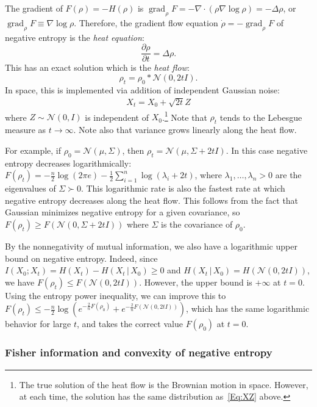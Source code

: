 \documentclass[final,12pt]{colt2018}
\newcommand{\N}{\mathcal{N}}
\renewcommand{\part}[2]{\frac{\partial #1}{\partial #2}}
\DeclareMathOperator{\grad}{grad}
\begin{document}
The gradient of $F(\rho) = -H(\rho)$ is $\grad_\rho F = -\nabla \cdot (\rho \nabla \log \rho) = -\Delta \rho$,
or $\grad_\rho F \equiv \nabla \log \rho$.
Therefore, the gradient flow equation $\dot \rho = -\grad_\rho F$ of negative entropy is the {\em heat equation}:
$$\part{\rho}{t} = \Delta \rho.$$
This has an exact solution which is the {\em heat flow}:
$$\rho_t = \rho_0 \ast \N(0,2t I).$$
In space, this is implemented via addition of independent Gaussian noise:
\begin{align}\label{Eq:XZ}
X_t = X_0 + \sqrt{2t} Z
\end{align}
where $Z \sim \N(0,I)$ is independent of $X_0$.\footnote{The true solution of the heat flow is the Brownian motion in space.
However, at each time, the solution has the same distribution as~\eqref{Eq:XZ} above.}
Note that $\rho_t$ tends to the Lebesgue measure as $t \to \infty$.
Note also that variance grows linearly along the heat flow.

For example, if $\rho_0 = \N(\mu,\Sigma)$, then $\rho_t = \N(\mu,\Sigma + 2tI)$.
In this case negative entropy decreases logarithmically:
$F(\rho_t) = -\frac{n}{2} \log (2\pi e) - \frac{1}{2} \sum_{i=1}^n \log (\lambda_i + 2t)$, where $\lambda_1,\dots,\lambda_n > 0$ are the eigenvalues of $\Sigma \succ 0$.
%
This logarithmic rate is also the fastest rate at which negative entropy decreases along the heat flow.
This follows from the fact that 
Gaussian minimizes negative entropy for a given covariance, so
$F(\rho_t) \ge F(\N(0,\Sigma+2tI))$ where $\Sigma$ is the covariance of $\rho_0$.

By the nonnegativity of mutual information, we also have a logarithmic upper bound on negative entropy.
Indeed, since $I(X_0;X_t) = H(X_t) - H(X_t \,|\, X_0) \ge 0$ and $H(X_t\,|\,X_0) = H(\N(0,2tI))$, we have $F(\rho_t) \le F(\N(0,2tI))$.
However, the upper bound is $+\infty$ at $t = 0$.
Using the entropy power inequality, 
we can improve this to $F(\rho_t) \le -\frac{n}{2} \log(e^{-\frac{2}{n} F(\rho_0)} + e^{-\frac{2}{n} F(\N(0,2tI))})$,
which has the same logarithmic behavior for large $t$, and takes the correct value $F(\rho_0)$ at $t = 0$.


\subsubsection{Fisher information and convexity of negative entropy}
\label{Sec:Fish}
\end{document}
